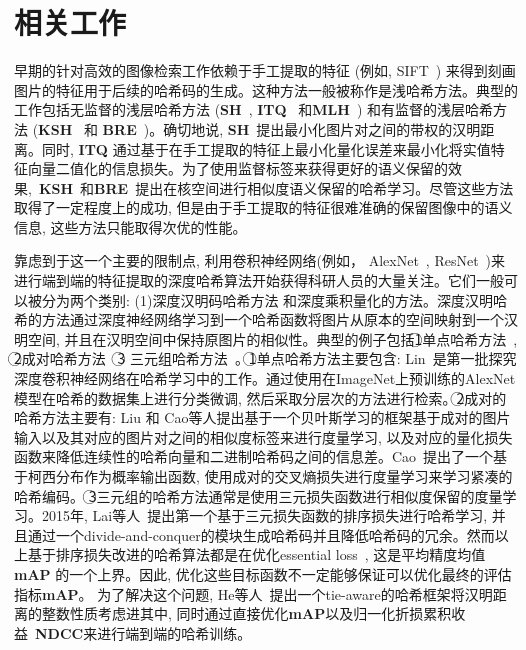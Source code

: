 \section{相关工作}
早期的针对高效的图像检索工作依赖于手工提取的特征 (例如, SIFT~\cite{lowe2004distinctive}) 来得到刻画图片的特征用于后续的哈希码的生成。这种方法一般被称作是浅哈希方法。典型的工作包括无监督的浅层哈希方法 (\textbf{SH}~\cite{weiss2008spectral}, \textbf{ITQ}~\cite{gong2012iterative} 和\textbf{MLH}~\cite{norouzi2011minimal}) 和有监督的浅层哈希方法 (\textbf{KSH}~\cite{liu2012supervised} 和 \textbf{BRE}~\cite{kulis2009learning})。确切地说, \textbf{SH}~\cite{weiss2008spectral}提出最小化图片对之间的带权的汉明距离。同时, \textbf{ITQ} 通过基于在手工提取的特征上最小化量化误差来最小化将实值特征向量二值化的信息损失。为了使用监督标签来获得更好的语义保留的效果,~\textbf{KSH}~\cite{liu2012supervised}和\textbf{BRE}~\cite{kulis2009learning}提出在核空间进行相似度语义保留的哈希学习。尽管这些方法取得了一定程度上的成功, 但是由于手工提取的特征很难准确的保留图像中的语义信息, 这些方法只能取得次优的性能。\par
靠虑到于这一个主要的限制点, 利用卷积神经网络(例如， AlexNet~\cite{alexnet}, ResNet~\cite{he2016deep})来进行端到端的特征提取的深度哈希算法开始获得科研人员的大量关注。它们一般可以被分为两个类别: (1)深度汉明码哈希方法 和深度乘积量化的方法。深度汉明哈希的方法通过深度神经网络学习到一个哈希函数将图片从原本的空间映射到一个汉明空间, 并且在汉明空间中保持原图片的相似性。典型的例子包括\textcircled{1}单点哈希方法~\cite{lin2015deep}, \textcircled{2}成对哈希方法~\cite{liu2016deep,cao2017hashnet,cao2018deep,fan2020deep} \textcircled{3} 三元组哈希方法~\cite{lai2015simultaneous,wang2016deep,li2019triplet}。\textcircled{1}单点哈希方法主要包含: Lin~\cite{lin2015deep}是第一批探究深度卷积神经网络在哈希学习中的工作。通过使用在ImageNet上预训练的AlexNet模型在哈希的数据集上进行分类微调, 然后采取分层次的方法进行检索。\textcircled{2}成对的哈希方法主要有: Liu 和 Cao等人\cite{liu2016deep,cao2017hashnet}提出基于一个贝叶斯学习的框架基于成对的图片输入以及其对应的图片对之间的相似度标签来进行度量学习, 以及对应的量化损失函数来降低连续性的哈希向量和二进制哈希码之间的信息差。Cao~\cite{cao2018deep}提出了一个基于柯西分布作为概率输出函数, 使用成对的交叉熵损失进行度量学习来学习紧凑的哈希编码。 \textcircled{3}三元组的哈希方法通常是使用三元损失函数进行相似度保留的度量学习。2015年, Lai等人~\cite{lai2015simultaneous}提出第一个基于三元损失函数的排序损失进行哈希学习, 并且通过一个divide-and-conquer的模块生成哈希码并且降低哈希码的冗余。然而以上基于排序损失改进的哈希算法都是在优化essential loss~\cite{liu2011learning}, 这是平均精度均值\textbf{mAP} 的一个上界。因此, 优化这些目标函数不一定能够保证可以优化最终的评估指标\textbf{mAP}。 为了解决这个问题, He等人~\cite{he2018hashing}提出一个tie-aware的哈希框架将汉明距离的整数性质考虑进其中, 同时通过直接优化\textbf{mAP}以及归一化折损累积收益~\textbf{NDCC}来进行端到端的哈希训练。\par
